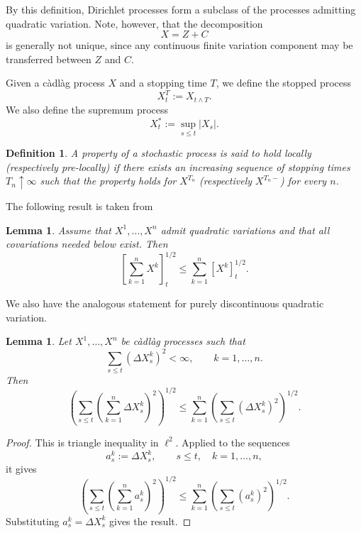 \documentclass[a4paper,10pt]{article}
\newtheorem{lemma}[thm]{Lemma}
\newtheorem{defin}[thm]{Definition}
\begin{document}
By this definition, Dirichlet processes form a subclass of the processes
admitting quadratic variation. Note, however, that the decomposition
\[
X=Z+C
\]
is generally not unique, since any continuous finite variation component
may be transferred between \(Z\) and \(C\).

Given a c\`adl\`ag process \(X\) and a stopping time \(T\), we define
the stopped process
\[
X^T_t:=X_{t\wedge T}.
\]
We also define the supremum process
\[
X_t^*:=\sup_{s\le t}|X_s|.
\]

\begin{defin}\label{loc}
A property of a stochastic process is said to hold locally
(respectively pre-locally) if there exists an increasing sequence of
stopping times \(T_n\uparrow\infty\) such that the property holds for
\(X^{T_n}\) (respectively \(X^{T_n-}\)) for every \(n\).
\end{defin}


The following result is taken from \cite{Collectanea}
\begin{lemma}\label{triangle}
Assume that \(X^1,\ldots,X^n\) admit quadratic variations and
that all covariations needed below exist. Then
\[
        \left[\sum_{k=1}^n X^k\right]_t^{1/2}
        \le
        \sum_{k=1}^n [X^k]_t^{1/2}.
\]
\end{lemma}

We also have the analogous statement for purely discontinuous quadratic variation.

\begin{lemma}
\label{lem:disc-qv-triangle}
Let \(X^1,\ldots,X^n\) be c\`adl\`ag processes such that
\[
        \sum_{s\le t}(\Delta X^k_s)^2<\infty,
        \qquad k=1,\ldots,n.
\]
Then
\[
        \left(
        \sum_{s\le t}
        \left(\sum_{k=1}^n \Delta X^k_s\right)^2
        \right)^{1/2}
        \le
        \sum_{k=1}^n
        \left(
        \sum_{s\le t}(\Delta X^k_s)^2
        \right)^{1/2}.
\]
\end{lemma}

\begin{proof}
This is triangle inequality in \(\ell^2\). Applied to
the sequences
\[
        a^k_s:=\Delta X^k_s,
        \qquad s\le t,\quad k=1,\ldots,n,
\]
it gives
\[
        \left(
        \sum_{s\le t}
        \left(\sum_{k=1}^n a^k_s\right)^2
        \right)^{1/2}
        \le
        \sum_{k=1}^n
        \left(
        \sum_{s\le t}(a^k_s)^2
        \right)^{1/2}.
\]
Substituting \(a^k_s=\Delta X^k_s\) gives the result.
\end{proof}
\end{document}
